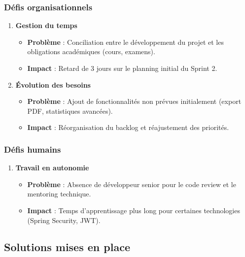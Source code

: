 \documentclass[12pt,a4paper]{report}
\begin{document}
\subsubsection{Défis organisationnels}

\begin{enumerate}[leftmargin=1cm]
    \item \textbf{Gestion du temps}
    \begin{itemize}
        \item \textbf{Problème} : Conciliation entre le développement du projet et les obligations académiques (cours, examens).
        \item \textbf{Impact} : Retard de 3 jours sur le planning initial du Sprint 2.
    \end{itemize}
    
    \item \textbf{Évolution des besoins}
    \begin{itemize}
        \item \textbf{Problème} : Ajout de fonctionnalités non prévues initialement (export PDF, statistiques avancées).
        \item \textbf{Impact} : Réorganisation du backlog et réajustement des priorités.
    \end{itemize}
\end{enumerate}

\subsubsection{Défis humains}

\begin{enumerate}[leftmargin=1cm]
    \item \textbf{Travail en autonomie}
    \begin{itemize}
        \item \textbf{Problème} : Absence de développeur senior pour le code review et le mentoring technique.
        \item \textbf{Impact} : Temps d'apprentissage plus long pour certaines technologies (Spring Security, JWT).
    \end{itemize}
\end{enumerate}

\subsection{Solutions mises en place}
\end{document}
